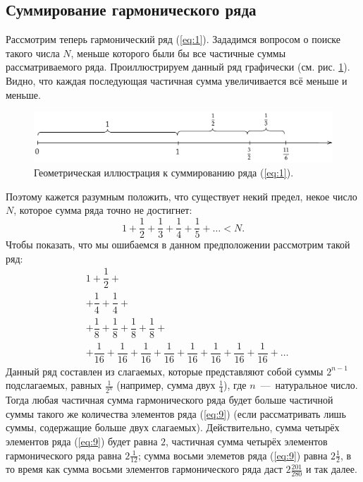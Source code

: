 \documentclass[12pt]{article}
\begin{document}
\subsection{Суммирование гармонического ряда}
Рассмотрим теперь гармонический ряд (\ref{eq:1}). Зададимся вопросом о поиске такого числа $N$, меньше которого были бы все частичные суммы рассматриваемого ряда. Проиллюстрируем данный ряд графически (см. рис. \ref{fig:2}). Видно, что каждая последующая частичная сумма увеличивается всё меньше и меньше.
\begin{figure}[h]
    \centering
    \includegraphics[width = 1\textwidth]{Лекция 2/fig2.png}
    \caption{Геометрическая иллюстрация к суммированию ряда (\ref{eq:1}).}
    \label{fig:2}
\end{figure}
Поэтому кажется разумным положить, что существует некий предел, некое число $N$, которое сумма ряда точно не достигнет:
\begin{equation}\label{eq:7}
    1 + \dfrac{1}{2} + \dfrac13 + \dfrac14 + \dfrac15 + \ldots < N.
\end{equation}
Чтобы показать, что мы ошибаемся в данном предположении рассмотрим такой ряд:
\begin{equation}\label{eq:9}
    \begin{split}
        &1 + \dfrac12 +\\
        &+ \dfrac14 + \dfrac14 +\\
        &+ \dfrac18+ \dfrac18+ \dfrac18+ \dfrac18 +\\
        &+ \dfrac1{16}+ \dfrac1{16}+ \dfrac1{16}+ \dfrac1{16} + \dfrac1{16}+ \dfrac1{16}+ \dfrac1{16}+ \dfrac1{16} + \ldots
    \end{split}
\end{equation}
Данный ряд составлен из слагаемых, которые представляют собой суммы $2^{n-1}$ подслагаемых, равных $\tfrac{1}{2^n}$ (например, сумма двух $\tfrac{1}{4}$), где $n$~\----~натуральное число. Тогда любая частичная сумма гармонического ряда будет больше  частичной суммы такого же количества элементов ряда (\ref{eq:9}) (если рассматривать лишь суммы, содержащие больше двух слагаемых). Действительно, сумма четырёх элементов ряда (\ref{eq:9}) будет равна $2$, частичная сумма четырёх элементов гармонического ряда равна $2\tfrac{1}{12}$; сумма восьми элеметов ряда (\ref{eq:9}) равна $2\tfrac12$, в то время как сумма восьми элементов гармонического ряда даст $2 \tfrac{201}{280}$ и так далее.
\end{document}
